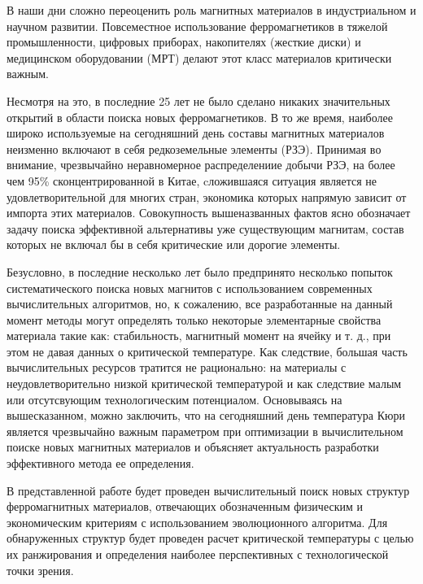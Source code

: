 В наши дни сложно переоценить роль магнитных материалов в индустриальном и научном развитии. Повсеместное использование ферромагнетиков в тяжелой промышленности, цифровых приборах, накопителях (жесткие диски) и медицинском оборудовании (МРТ) делают этот класс материалов критически важным.

Несмотря на это, в последние 25 лет не было сделано никаких значительных открытий в области поиска новых ферромагнетиков. В то же время, наиболее широко используемые на сегодняшний день составы магнитных материалов неизменно включают в себя редкоземельные элементы (РЗЭ).  Принимая во внимание, чрезвычайно неравномерное распределениие добычи РЗЭ,  на более чем 95\% сконцентрированной в Китае, cложившаяся ситуация является не удовлетворительной для многих стран, экономика которых напрямую зависит от импорта этих материалов.
Совокупность вышеназванных фактов ясно обозначает задачу поиска эффективной альтернативы уже существующим магнитам, состав которых не включал бы в себя критические или дорогие элементы.

Безусловно, в последние несколько лет было предпринято несколько попыток систематического поиска новых магнитов с использованием современных вычислительных алгоритмов, но, к сожалению, все разработанные на данный момент методы могут определять только некоторые элементарные свойства материала такие как: стабильность, магнитный момент на ячейку и т. д., при этом не давая данных о критической температуре.  Как следствие, большая часть вычислительных ресурсов тратится не рационально: на материалы с неудовлетворительно низкой критической температурой и как следствие малым или отсутсвующим технологическим потенциалом. Основываясь на вышесказанном, можно заключить, что на сегодняшний день температура Кюри является чрезвычайно важным параметром при оптимизации в вычислительном поиске новых магнитных материалов и объясняет актуальность разработки эффективного метода ее определения.

В представленной работе будет проведен вычислительный поиск новых структур ферромагнитных материалов, отвечающих обозначенным физическим и экономическим критериям с использованием эволюционного алгоритма. Для обнаруженных структур будет проведен расчет критической температуры с целью их ранжирования и определения наиболее перспективных с технологической точки зрения. 

